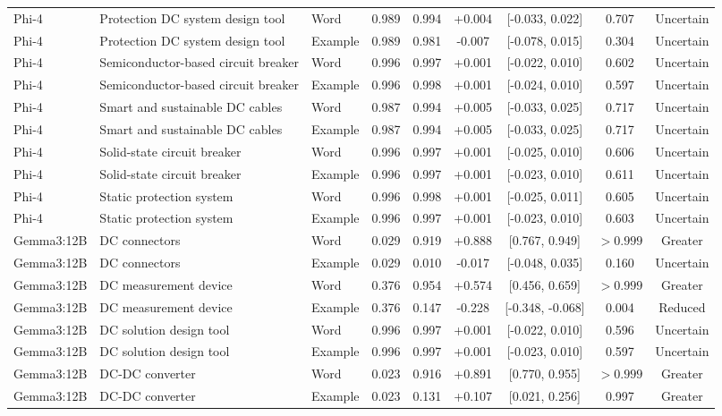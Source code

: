 \begin{landscape}
\begin{longtable}{lllcccccc}
Phi-4 & Protection DC system design tool & Word & 0.989 & 0.994 & +0.004 & [-0.033, 0.022] & 0.707 & Uncertain \\
Phi-4 & Protection DC system design tool & Example & 0.989 & 0.981 & -0.007 & [-0.078, 0.015] & 0.304 & Uncertain \\
Phi-4 & Semiconductor-based circuit breaker & Word & 0.996 & 0.997 & +0.001 & [-0.022, 0.010] & 0.602 & Uncertain \\
Phi-4 & Semiconductor-based circuit breaker & Example & 0.996 & 0.998 & +0.001 & [-0.024, 0.010] & 0.597 & Uncertain \\
Phi-4 & Smart and sustainable DC cables & Word & 0.987 & 0.994 & +0.005 & [-0.033, 0.025] & 0.717 & Uncertain \\
Phi-4 & Smart and sustainable DC cables & Example & 0.987 & 0.994 & +0.005 & [-0.033, 0.025] & 0.717 & Uncertain \\
Phi-4 & Solid-state circuit breaker & Word & 0.996 & 0.997 & +0.001 & [-0.025, 0.010] & 0.606 & Uncertain \\
Phi-4 & Solid-state circuit breaker & Example & 0.996 & 0.997 & +0.001 & [-0.023, 0.010] & 0.611 & Uncertain \\
Phi-4 & Static protection system & Word & 0.996 & 0.998 & +0.001 & [-0.025, 0.011] & 0.605 & Uncertain \\
Phi-4 & Static protection system & Example & 0.996 & 0.997 & +0.001 & [-0.023, 0.010] & 0.603 & Uncertain \\
Gemma3:12B & DC connectors & Word & 0.029 & 0.919 & +0.888 & [0.767, 0.949] & $>0.999$ & Greater \\
Gemma3:12B & DC connectors & Example & 0.029 & 0.010 & -0.017 & [-0.048, 0.035] & 0.160 & Uncertain \\
Gemma3:12B & DC measurement device & Word & 0.376 & 0.954 & +0.574 & [0.456, 0.659] & $>0.999$ & Greater \\
Gemma3:12B & DC measurement device & Example & 0.376 & 0.147 & -0.228 & [-0.348, -0.068] & 0.004 & Reduced \\
Gemma3:12B & DC solution design tool & Word & 0.996 & 0.997 & +0.001 & [-0.022, 0.010] & 0.596 & Uncertain \\
Gemma3:12B & DC solution design tool & Example & 0.996 & 0.997 & +0.001 & [-0.023, 0.010] & 0.597 & Uncertain \\
Gemma3:12B & DC-DC converter & Word & 0.023 & 0.916 & +0.891 & [0.770, 0.955] & $>0.999$ & Greater \\
Gemma3:12B & DC-DC converter & Example & 0.023 & 0.131 & +0.107 & [0.021, 0.256] & 0.997 & Greater \\

\end{longtable}
\end{landscape}
